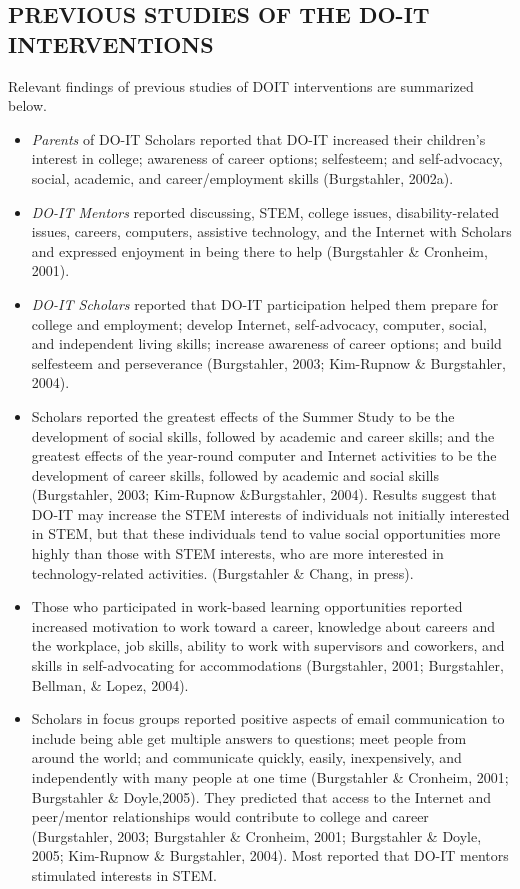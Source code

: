 \documentclass[11.5pt]{sig-alternate} %
\begin{document}
\begin{large}
\section*{PREVIOUS STUDIES OF THE DO-IT INTERVENTIONS }
 
Relevant findings of previous studies of DOIT interventions are summarized below. 
 
\begin{itemize}
    \item 	\textit{Parents} of DO-IT Scholars reported that DO-IT increased their children’s interest in college; awareness of career options; selfesteem; and self-advocacy, social, academic, and career/employment skills (Burgstahler, 2002a).
    \item 	\textit{DO-IT Mentors} reported discussing, STEM, college issues, disability-related issues, careers, computers, assistive technology, and the Internet with Scholars and expressed enjoyment in being there to help (Burgstahler \& Cronheim, 2001).
    \item 	\textit{DO-IT Scholars} reported that DO-IT participation helped them prepare for college and employment; develop Internet, self-ad\-vocacy, computer, social, and independent living skills; increase awareness of career options; and build selfesteem and perseverance (Burg\-stahler, 2003; Kim-Rupnow \& Burgstahler, 2004).
    \item 	Scholars reported the greatest effects of the Summer Study to be the development of social skills, followed by academic and career skills; and the greatest effects of the year-round computer and Internet activities to be the development of career skills, followed by academic and social skills (Burgstahler, 2003; Kim-Rupnow \&Burgstahler, 2004). Results suggest that DO-IT may increase the STEM interests of individuals not initially interested in STEM, but that these individuals tend to value social opportunities more highly than those with STEM interests, who are more interested in technology-related activities. (Burgstahler \& Chang, in press).
    \item 	Those who participated in work-based learning opportunities reported increased motivation to work toward a career, knowledge about careers and the workplace, job skills, ability to work with supervisors and coworkers, and skills in self-advocating for accommodations (Burgstahler, 2001; Burgstahler, Bellman, \& Lopez, 2004).
    \item 	Scholars in focus groups reported positive aspects of email communication to include being able get multiple answers to questions; meet people from around the world; and communicate quickly, easily, inexpensively, and independently with many people at one time (Burgstahler \& Cronheim, 2001; Burgstahler \& Doyle,2005). They predicted that access to the Internet and peer/mentor relationships would contribute to college and career (Burgstahler, 2003; Burgstahler \& Cronheim, 2001; Burgstahler \& Doyle, 2005; Kim-Rupnow \& Burgstahler, 2004). Most reported that DO-IT mentors stimulated interests in STEM.

\end{itemize}
\end{large}
\end{document}
